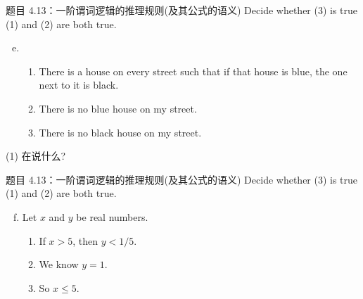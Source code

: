 \begin{frame}{}
  \begin{exampleblock}{题目 4.13：一阶谓词逻辑的推理规则(及其公式的语义)}
    Decide whether (3) is true  (1) and (2) are both true.

    \begin{enumerate}[(a)]
      \setcounter{enumi}{4}
      \item 
	\begin{enumerate}[(1)]
	  \item There is a house on every street such that if that house is blue,
	    the one next to it is black.
	  \item There is no blue house on my street.
	  \item There is no black house on my street.
	\end{enumerate}
    \end{enumerate}
  \end{exampleblock}

  \vspace{0.50cm}
  \centerline{(1) 在说什么?}
\end{frame}

\begin{frame}{}
  \begin{exampleblock}{题目 4.13：一阶谓词逻辑的推理规则(及其公式的语义)}
    Decide whether (3) is true  (1) and (2) are both true.

    \begin{enumerate}[(a)]
      \setcounter{enumi}{5}
      \item Let $x$ and $y$ be real numbers.
	\begin{enumerate}[(1)]
	  \item If $x > 5$, then $y < 1/5$.
	  \item We know $y = 1$.
	  \item So $x \le 5$.
	\end{enumerate}
    \end{enumerate}
  \end{exampleblock}
\end{frame}

